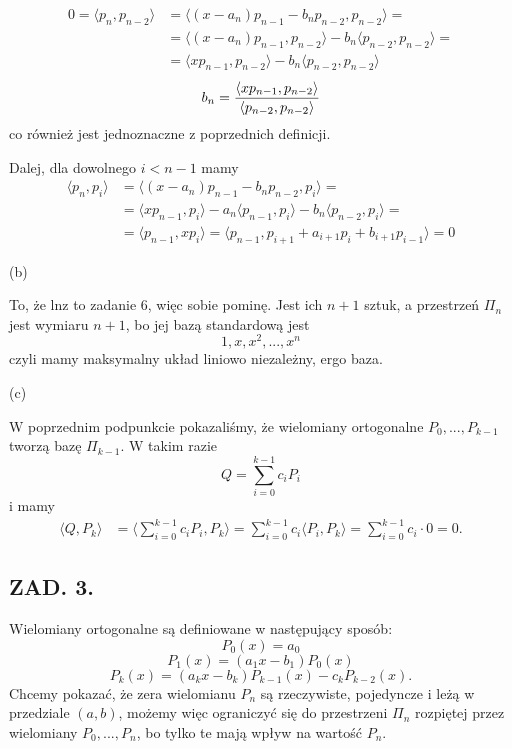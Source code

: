 \documentclass{article}[16pt]
\begin{document}
\begin{align*}
    0=\langle p_n,p_{n-2}\rangle&=\langle (x-a_n)p_{n-1}-b_np_{n-2}, p_{n-2}\rangle=\\
    &=\langle (x-a_n)p_{n-1},p_{n-2}\rangle-b_n\langle p_{n-2},p_{n-2}\rangle=\\
    &=\langle xp_{n-1},p_{n-2}\rangle-b_n\langle p_{n-2},p_{n-2}\rangle
\end{align*}
$$b_n={\langle xp_{n-1},p_{n-2}\rangle\over \langle p_{n-2},p_{n-2}\rangle}$$
co również jest jednoznaczne z poprzednich definicji.
\medskip

Dalej, dla dowolnego $i<n-1$ mamy
\begin{align*}
    \langle p_n,p_i\rangle&=\langle (x-a_n)p_{n-1}-b_np_{n-2},p_i\rangle=\\
    &=\langle xp_{n-1},p_i\rangle-a_n\langle p_{n-1},p_i\rangle -b_n\langle p_{n-2},p_i\rangle=\\
    &=\langle p_{n-1},xp_i\rangle=\langle p_{n-1},p_{i+1}+a_{i+1}p_i+b_{i+1}p_{i-1}\rangle =0
\end{align*}

{\color{def}(b)}

To, że lnz to zadanie 6, więc sobie pominę. Jest ich $n+1$ sztuk, a przestrzeń $\Pi_n$ jest wymiaru $n+1$, bo jej bazą standardową jest
$$1,x,x^2,...,x^n$$
czyli mamy maksymalny układ liniowo niezależny, ergo baza.

{\color{def}(c)}

W poprzednim podpunkcie pokazaliśmy, że wielomiany ortogonalne $P_0,...,P_{k-1}$ tworzą bazę $\Pi_{k-1}$. W takim razie
$$Q=\sum\limits_{i=0}^{k-1}c_iP_i$$
i mamy
\begin{align*}
    \langle Q,P_k\rangle &=\langle \sum\limits_{i=0}^{k-1}c_iP_i,P_k\rangle=\sum\limits_{i=0}^{k-1}c_i\langle P_i,P_k\rangle=\sum\limits_{i=0}^{k-1}c_i\cdot 0=0.
\end{align*}


\subsection*{ZAD. 3.}

Wielomiany ortogonalne są definiowane w następujący sposób:
$$P_0(x)=a_0$$
$$P_1(x)=(a_1x-b_1)P_0(x)$$
$$P_k(x)=(a_kx-b_k)P_{k-1}(x)-c_kP_{k-2}(x).$$
Chcemy pokazać, że zera wielomianu $P_n$ są rzeczywiste, pojedyncze i leżą w przedziale $(a, b)$, możemy więc ograniczyć się do przestrzeni $\Pi_n$ rozpiętej przez wielomiany $P_0,...,P_n$, bo tylko te mają wpływ na wartość $P_n$.
\end{document}
